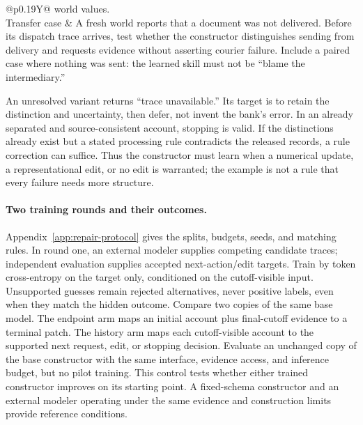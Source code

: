 \documentclass[10pt]{article}
\begin{document}
\begin{table}[!htb]
\begin{tabularx}{\textwidth}{@{}p{}Y@{}}
world values. \\
Transfer case & A fresh world reports that a document was not delivered.
Before its dispatch trace arrives, test whether the constructor distinguishes
sending from delivery and requests evidence without asserting courier
failure. Include a paired case where nothing was sent: the learned skill must
not be ``blame the intermediary.'' \\
\bottomrule
\end{tabularx}
\caption{A proposed repair-learning sequence, not a recorded experimental
result. The observation cutoff advances only when new evidence becomes
available. Dates and pounds are world data; no numerical moral score is needed.}
\label{tab:repair-pilot-example}
\end{table}

An unresolved variant returns ``trace unavailable.'' Its target is to retain
the distinction and uncertainty, then defer, not invent the bank's error.
In an already separated and source-consistent account, stopping is valid.
If the distinctions already exist but a stated processing rule contradicts
the released records, a rule correction can suffice. Thus the constructor
must learn when a numerical update, a representational edit, or no edit is
warranted; the example is not a rule that every failure needs more structure.

\paragraph{Two training rounds and their outcomes.}
Appendix~\ref{app:repair-protocol} gives the splits, budgets, seeds, and matching rules.
In round one, an external modeler supplies competing candidate traces;
independent evaluation supplies accepted next-action/edit targets. Train by
token cross-entropy on the target only,
conditioned on the cutoff-visible input. Unsupported guesses remain rejected
alternatives, never positive labels, even when they match the hidden outcome.
Compare two copies of the same base model. The endpoint arm maps an initial
account plus final-cutoff evidence to a terminal patch. The history arm maps
each cutoff-visible account to the supported next request, edit, or stopping
decision. Evaluate an unchanged copy of the base constructor with the
same interface, evidence access, and inference budget, but no pilot training.
This control tests whether either trained constructor improves on its starting
point. A fixed-schema constructor and an external modeler operating
under the same evidence and construction limits provide reference conditions.
\end{document}
